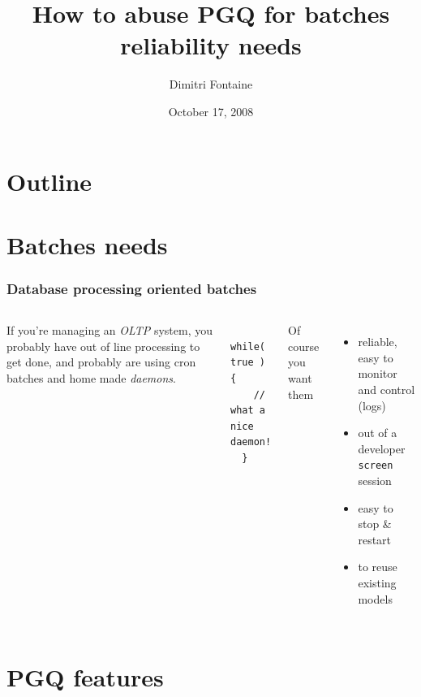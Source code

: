 \documentclass{beamer}
\title{How to abuse PGQ for batches reliability needs}
\author{Dimitri Fontaine}
\date{October 17, 2008}
\begin{document}
\frame{\titlepage}

\section*{Outline}

\section{Batches needs}

\begin{frame}[fragile]
  \frametitle{Database processing oriented batches}

\begin{columns}[c]


If you're managing an \textit{OLTP} system, you probably have out of line
processing to get done, and probably are using cron batches and home made
\textit{daemons}.

\pause
\begin{example}
\begin{verbatim}
  while( true ) {
    // what a nice daemon!
  }
\end{verbatim}
\end{example}

\pause
{} 
  Of course you want them 
  \begin{itemize}
   \item<3-> reliable, easy to monitor and control (logs)
   \item<4-> out of a developer \texttt{screen} session
   \item<5-> easy to stop \& restart
   \item<6-> to reuse existing models
  \end{itemize}

\end{columns}
\end{frame}

\section{PGQ features}

\end{document}
